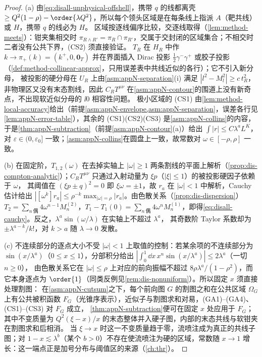 \begin{proof}
(a) 由\cref{eq:disall-unphysical-offshell}，携带 $q$ 的线都离壳 $\ge Q^2(1-\rho)-\order{\lambda Q^2}$，所以每个领头区域是在每条线上指派 $A$（靶共线）或 $H$，携带 $q$ 的线必为 $H$。
区域按逐线偏序比较，交逐线取得（\cref{lem:method-meets}）：钳夹集相交时 $\pi_{R\wedge R'}=\pi_R\cap\pi_{R'}$，交属于交封闭的区域集合；不相交时二者没有公共下界，(CS2) 须直接验证。
$T_R$ 在 $H_R$ 中作 $k\to\pi_+(k)=(k^+,0,\mathbf 0_T)$ 并在界面插入 Dirac 投影 $\frac12\gamma^-\gamma^+$ 或胶子投影（\cref{def:method-collinear-approx}，只用误差表中共线近似的各行）；它不引入新分母，
被投影的硬分母在 $U_R$ 上由\cref{asm:appN-separation}(i) 满足 $|l^2-M_l^2|\ge c\,t_R^2$，非物理区又没有末态割线，因此 $C_RT^{\mu\nu}$ 在\cref{asm:appN-contour}的围道上没有新奇点，不出现软近似分母的 $\ii0$ 相容性问题。
极小区域的 (CS1) 由\cref{lem:method-local-accuracy}给出（前提\cref{asm:appN-envelope,asm:appN-separation}，误差各行见\cref{lem:appN-error-table}），其余的 (CS1)(CS2)(CS3) 是\cref{asm:appN-collins}的内容，
于是\cref{thm:appN-subtraction}（前提\cref{asm:appN-contour}(a)）给出 $\int|r|\le C\lambda^aL^K$，对 $\varepsilon\in(0,\varepsilon_0]$ 一致；\cref{asm:appN-collins}在圆盘上一致，故常数对 $\omega\in[-\rho,\rho]$ 一致。

(b) 在固定阶，$T_{1,2}(\omega)$ 在去掉实轴上 $|\omega|\ge1$ 两条割线的平面上解析（\cref{prop:dis-compton-analytic}）；$C_RT^{\mu\nu}$ 只通过入射动量为 $\xi p$（$|\xi|\le1$）的被投影硬因子依赖于 $\omega$，
其阈值在 $(\xi p\pm q)^2=0$ 即 $\xi\omega=\pm1$，故 $r_a$ 在 $|\omega|<1$ 中解析，Cauchy 估计给出 $|[\omega^k]r_a|\le\rho^{-k}\max_{|\omega|=\rho}|r_a|$。由色散关系（\cref{prop:dis-dispersion}）
$T_2=\sum_{n\ \text{偶}}4\omega^{n-1}M^{(2)}_n$，$T_1-T_1(0)=\sum_{n\ \text{偶}}4\omega^nM^{(1)}_n$，即得\cref{eq:disall-cauchy}。反之，$\lambda^a\sin(\omega/\lambda)$ 在实轴上不超过 $\lambda^a$，
其奇数阶 Taylor 系数却为 $\pm\lambda^{a-k}/k!$，对 $k>a$ 随 $\lambda\to0$ 发散。

(c) 不连续部分的逐点大小不受 $|\omega|<1$ 上取值的控制：若某余项的不连续部分为 $\sin(x/\lambda^a)$（$0\le x\le1$），分部积分给出 $|\int_0^1\dd x\,x^n\sin(x/\lambda^a)|\le2\lambda^a$（一切 $n\ge0$），
由色散关系它在 $|\omega|\le\rho$ 上对应的前向振幅不超过 $8\rho\lambda^a/(1-\rho^2)$，而它本身逐点为 $\order{1}$（同类反例见\cref{rem:dis-nonuniform}）。所以固定 $x$ 须直接处理割图：
在\cref{asm:appN-cutsum}之下，每个前向图 $G$ 的割图之和在公共区域 $\Omega_G$ 上有公共被积函数 $F_G$（光锥序表示），近似子与割图求和对易，(GA1)–(GA4)、(CS1)–(CS3) 对 $F_G$ 成立，
\cref{thm:appN-subtraction}便可在固定 $x$ 处应用于 $F_G$；其中不变质量为 $Q^2(\xi-x)/x$ 的末态整体并入硬子图，内部的末态共线与软钳夹在割图求和后相消。
当 $\xi\to x$ 时这一不变质量趋于零，流喷注成为真正的共线子图；对 $1-x\lesssim\lambda^b$（某个 $b>0$）不存在使流喷注为硬的区域，常数随 $x\to1$ 增长：这一端点正是加号分布与阈值区的来源（\cref{ch:thr}）。
\end{proof}


